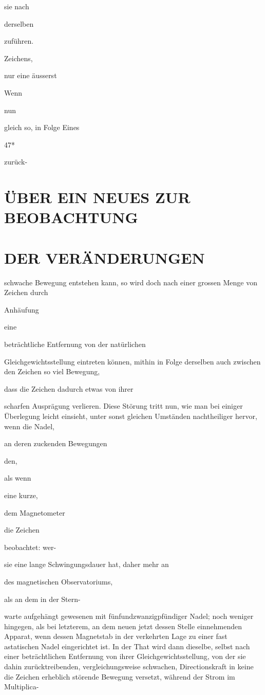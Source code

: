\documentclass[12pt,a4paper]{article}
\begin{document}
sie nach

derselben

zuführen.

Zeichens,

nur eine äusserst

Wenn

nun

gleich so, in Folge Eines

47*

zurück-

\section*{ÜBER EIN NEUES ZUR BEOBACHTUNG}
\section*{DER VERÄNDERUNGEN}
schwache Bewegung entstehen kann, so wird doch nach einer grossen Menge von Zeichen durch

Anhäufung

eine

beträchtliche Entfernung von der natürlichen

Gleichgewichtsstellung eintreten können, mithin in Folge derselben auch zwischen den Zeichen so viel Bewegung,

dass die Zeichen dadurch etwas von ihrer

scharfen Ausprägung verlieren. Diese Störung tritt nun, wie man bei einiger Überlegung leicht einsieht, unter sonst gleichen Umständen nachtheiliger hervor, wenn die Nadel,

an deren zuckenden Bewegungen

den,

als wenn

eine kurze,

dem Magnetometer

die Zeichen

beobachtet: wer-

sie eine lange Schwingungsdauer hat, daher mehr an

des magnetischen Observatoriums,

als an dem in der Stern-

warte aufgehängt gewesenen mit fünfundzwanzigpfündiger Nadel; noch weniger hingegen, als bei letzterem, an dem neuen jetzt dessen Stelle einnehmenden Apparat, wenn dessen Magnetstab in der verkehrten Lage zu einer fast astatischen Nadel eingerichtet ist. In der That wird dann dieselbe, selbst nach einer beträchtlichen Entfernung von ihrer Gleichgewichtsstellung, von der sie dahin zurücktreibenden, vergleichungsweise schwachen, Directionskraft in keine die Zeichen erheblich störende Bewegung versetzt, während der Strom im Multiplica-
\end{document}
